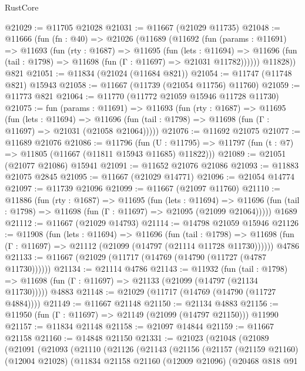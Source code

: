 \begin{lexlean}{RustCore}
\begin{coremodule}
@21029 := @11705 @21028
@21031 := @11667 (@21029 @11735)
@21048 := @11666
    (fun (fn : @40) =>
    @21026
      (@11689
        (@11692
          (fun (params : @11691) =>
          @11693
            (fun (rty : @1687) =>
            @11695
              (fun (lets : @11694) =>
              @11696 (fun (tail : @1798) => @11698 (fun (Γ : @11697) => @21031 @11782))))))
        @11828))
    @821
@21051 := @11834 (@21024 (@11684 @821))
@21054 := @11747 (@11748 @821) @15943
@21058 := @11667 (@11739 (@21054 @11756) @11760)
@21059 := @11773 @821
@21064 := @11770 (@11772 @21059 @15946 @11728 @11730)
@21075 := fun (params : @11691) =>
  @11693
    (fun (rty : @1687) =>
    @11695
      (fun (lets : @11694) =>
      @11696 (fun (tail : @1798) => @11698 (fun (Γ : @11697) => @21031 (@21058 @21064)))))
@21076 := @11692 @21075
@21077 := @11689 @21076
@21086 := @11796
    (fun (U : @11795) => @11797 (fun (t : @7) => @11805 (@11667 (@11811 @15943 @11685) @11822)))
@21089 := @21051 (@21077 @21086) @15941
@21091 := @11652 @21076 @21086
@21093 := @11883 @21075 @2845
@21095 := @11667 (@21029 @14771)
@21096 := @21054 @14774
@21097 := @11739 @21096
@21099 := @11667 (@21097 @11760)
@21110 := @11886
    (fun (rty : @1687) =>
    @11695
      (fun (lets : @11694) =>
      @11696 (fun (tail : @1798) => @11698 (fun (Γ : @11697) => @21095 (@21099 @21064)))))
    @1689
@21112 := @11667 (@21029 @14793)
@21114 := @14798 @21059 @15946
@21126 := @11908
    (fun (lets : @11694) =>
    @11696
      (fun (tail : @1798) =>
      @11698 (fun (Γ : @11697) => @21112 (@21099 (@14797 (@21114 @11728 @11730))))))
    @4786
@21133 := @11667 (@21029 (@11717 (@14769 (@14790 (@11727 (@4787 @11730))))))
@21134 := @21114 @4786
@21143 := @11932
    (fun (tail : @1798) => @11698 (fun (Γ : @11697) => @21133 (@21099 (@14797 (@21134 @11730)))))
    @4883
@21148 := @21029 (@11717 (@14769 (@14790 (@11727 @4884))))
@21149 := @11667 @21148
@21150 := @21134 @4883
@21156 := @11950 (fun (Γ : @11697) => @21149 (@21099 (@14797 @21150))) @11990
@21157 := @11834 @21148
@21158 := @21097 @14844
@21159 := @11667 @21158
@21160 := @14848 @21150
@21331 := @21023
    (@21048
      (@21089
        (@21091
          (@21093
            (@21110
              (@21126
                (@21143
                  (@21156
                    (@21157
                      (@21159 @21160)
                      (@12004 @21028)
                      (@11834
                        @21158
                        @21160
                        (@12009 @21096)
                        (@20468
                          @818
                          @91

\end{coremodule}
\end{lexlean}
